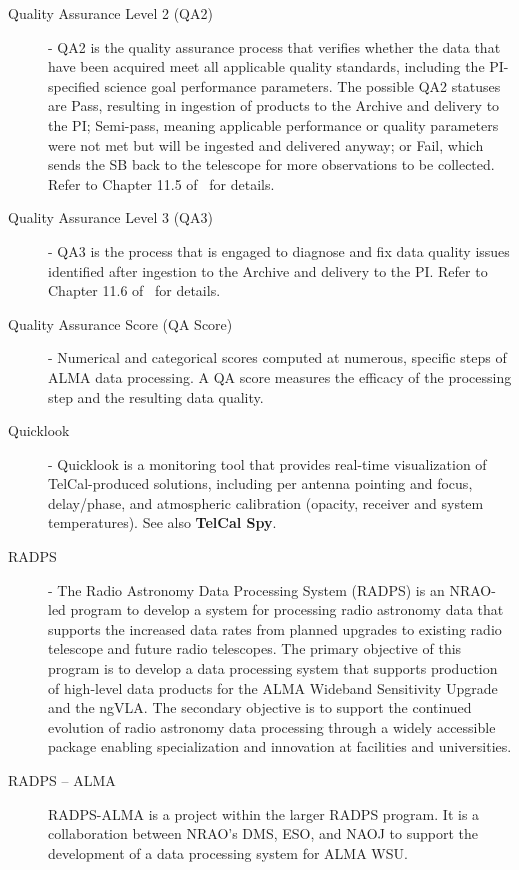 \begin{description}
\item[Quality Assurance Level 2 (QA2)] - QA2 is the quality assurance process that verifies whether the data that have been acquired meet all applicable quality
standards, including the PI-specified science goal performance parameters. The possible QA2 statuses are Pass, resulting in ingestion of products to the Archive and delivery to the PI; Semi-pass, meaning applicable performance or quality parameters were not met but will be ingested and delivered anyway; or Fail, which sends the SB back to the telescope for more observations to be collected. Refer to Chapter 11.5 of~\cite{c12_thb} for details.
\item[Quality Assurance Level 3 (QA3)] -  QA3 is the process that is engaged to diagnose and fix data quality issues identified after ingestion to the Archive and delivery to the PI.  Refer to Chapter 11.6 of~\cite{c12_thb} for details. 
\item[Quality Assurance Score (QA Score)] - Numerical and categorical scores computed at numerous, specific steps of ALMA data processing. A QA score measures the efficacy of the processing step and the resulting data quality.
\item[Quicklook] - Quicklook is a monitoring tool that provides real-time visualization of TelCal-produced solutions, including per antenna
pointing and focus, delay/phase, and atmospheric calibration (opacity, receiver and system tem\-peratures). See also \textbf{TelCal Spy}.
\item[RADPS] - The Radio Astronomy Data Processing System (RADPS) is an NRAO-led program to develop a system for processing radio astronomy data that supports the increased data rates from planned upgrades to existing radio telescope and future radio telescopes. The primary objective of this program is to develop a data processing system that supports production of high-level data products for the ALMA Wideband Sensitivity Upgrade and the ngVLA. The secondary objective is to support the continued evolution of radio astronomy data processing through a widely accessible package enabling specialization and innovation at facilities and universities.
\item[RADPS -- ALMA]  RADPS-ALMA is a project within the larger RADPS program. It is a collaboration between NRAO's DMS, ESO, and NAOJ to support the development of a data processing system for ALMA WSU.

\end{description}
